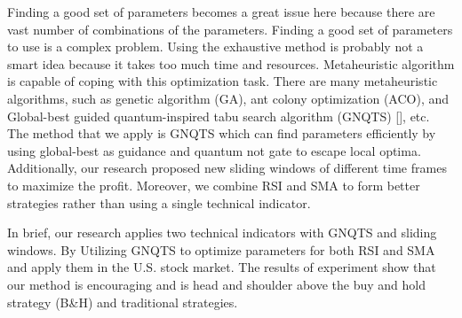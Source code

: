 \documentclass[../main.tex]{subfiles}
\begin{document}
\bigbreak

Finding a good set of parameters becomes a great issue here because there are vast number of combinations of the parameters. Finding a good set of parameters to use is a complex problem. Using the exhaustive method is probably not a smart idea because it takes too much time and resources. Metaheuristic algorithm is capable of coping with this optimization task. There are many metaheuristic algorithms, such as genetic algorithm (GA), ant colony optimization (ACO), and Global-best guided quantum-inspired tabu search algorithm (GNQTS) [], etc. The method that we apply is GNQTS which can find parameters efficiently by using global-best as guidance and quantum not gate to escape local optima. Additionally, our research proposed new sliding windows of different time frames to maximize the profit. Moreover, we combine RSI and SMA to form better strategies rather than using a single technical indicator.

\bigbreak

In brief, our research applies two technical indicators with GNQTS and sliding windows. By Utilizing GNQTS to optimize parameters for both RSI and SMA and apply them in the U.S. stock market. The results of experiment show that our method is encouraging and is head and shoulder above the buy and hold strategy (B\&H) and traditional strategies.
\end{document}
